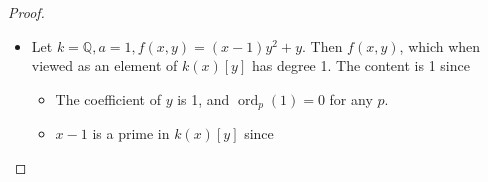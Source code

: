 \documentclass[12pt, psamsfonts]{amsart}
\theoremstyle{definition}
\theoremstyle{remark}
\DeclareMathOperator{\ord}{ord}
\numberwithin{equation}{section}
\begin{document}
\begin{proof}
\begin{itemize}
    \item
      Let $k = \mathbb{Q}, a = 1, f(x, y) = (x - 1)y^2 + y$.
      Then $f(x, y)$, which when viewed as an element of $k(x)[y]$ has degree 1.
      The content is 1 since
      \begin{itemize}
        \item
          The coefficient of $y$ is 1, and $\ord_p(1) = 0$ for any $p$.
        \item
          $x - 1$ is a prime in $k(x)[y]$ since
          \todo[inline]{
          }
      \end{itemize}
      \todo[inline]{
      }
  \end{itemize}
\end{proof}
\end{document}
